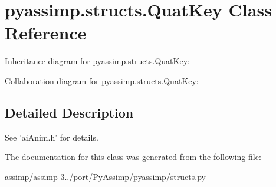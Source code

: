 \hypertarget{classpyassimp_1_1structs_1_1_quat_key}{\section{pyassimp.\+structs.\+Quat\+Key Class Reference}
\label{classpyassimp_1_1structs_1_1_quat_key}
}


Inheritance diagram for pyassimp.\+structs.\+Quat\+Key\+:


Collaboration diagram for pyassimp.\+structs.\+Quat\+Key\+:


\subsection{Detailed Description}
\begin{DoxyVerb}See 'aiAnim.h' for details.
\end{DoxyVerb}
 

The documentation for this class was generated from the following file\+:\begin{DoxyCompactItemize}
\item 
assimp/assimp-\/3../port/\+Py\+Assimp/pyassimp/structs.\+py\end{DoxyCompactItemize}
